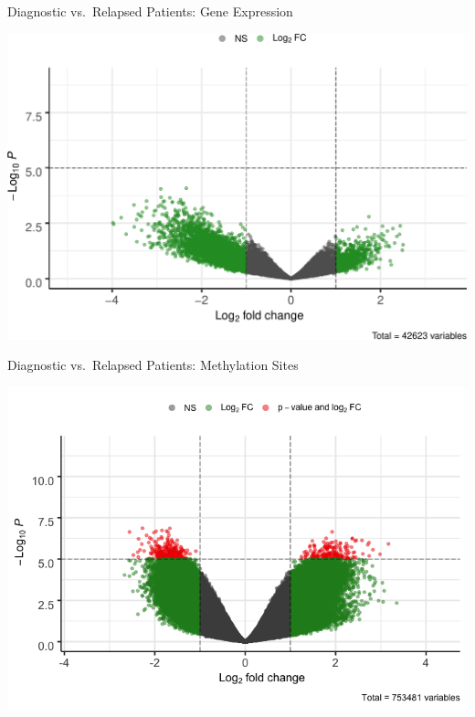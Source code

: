 \documentclass[ignorenonframetext,]{beamer}
\begin{document}
\begin{frame}{Diagnostic vs.~Relapsed Patients: Gene Expression}
\protect\hypertarget{diagnostic-vs.relapsed-patients-gene-expression}{}

\includegraphics[height=0.85\textheight]{final_presentation_slides_files/figure-beamer/DRDC_gene_volcano-1}

\end{frame}

\begin{frame}{Diagnostic vs.~Relapsed Patients: Methylation Sites}
\protect\hypertarget{diagnostic-vs.relapsed-patients-methylation-sites}{}

\includegraphics[height=0.85\textheight]{final_presentation_slides_files/figure-beamer/DRDC_methyl_volcano-1}

\end{frame}
\end{document}
